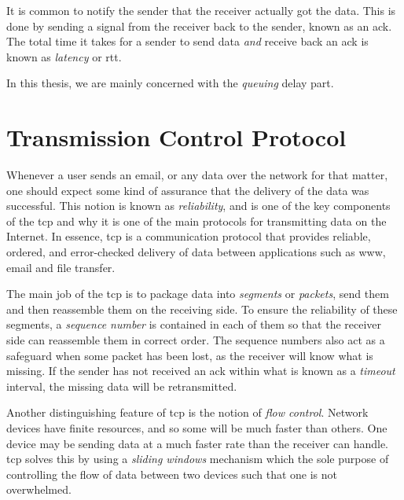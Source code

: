 It is common to notify the sender that the receiver actually got the data. This is done by sending a signal from the receiver back to the sender, known as an \gls{ack}. The total time it takes for a sender to send data \textit{and} receive back an \gls{ack} is known as \textit{latency} or \gls{rtt}.

In this thesis, we are mainly concerned with the \textit{queuing} delay part.









\section{Transmission Control Protocol} \label{sec:tcp}

Whenever a user sends an email, or any data over the network for that matter, one should expect some kind of assurance that the delivery of the data was successful. This notion is known as \textit{reliability}, and is one of the key components of the \gls{tcp} and why it is one of the main protocols for transmitting data on the Internet. In essence, \gls{tcp} is a communication protocol that provides reliable, ordered, and error-checked delivery of data between applications such as \gls{www}, email and file transfer.

The main job of the \gls{tcp} is to package data into \textit{segments} or \textit{packets}, send them and then reassemble them on the receiving side. To ensure the reliability of these segments, a \textit{sequence number} is contained in each of them so that the receiver side can reassemble them in correct order. The sequence numbers also act as a safeguard when some packet has been lost, as the receiver will know what is missing. If the sender has not received an \gls{ack} within what is known as a \textit{timeout} interval, the missing data will be retransmitted.

Another distinguishing feature of \gls{tcp} is the notion of \textit{flow control}. Network devices have finite resources, and so some will be much faster than others. One device may be sending data at a much faster rate than the receiver can handle. \gls{tcp} solves this by using a \textit{sliding windows} mechanism which the sole purpose of controlling the flow of data between two devices such that one is not overwhelmed.









